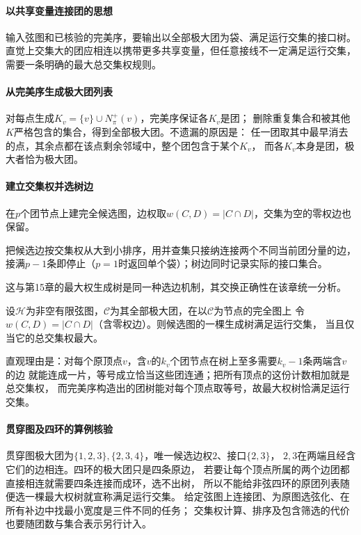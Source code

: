 \paragraph{以共享变量连接团的思想}
输入弦图和已核验的完美序，要输出以全部极大团为袋、满足运行交集的接口树。
直觉上交集大的团应相连以携带更多共享变量，但任意接线不一定满足运行交集，
需要一条明确的最大总交集权规则。

\paragraph{从完美序生成极大团列表}
对每点生成$K_v=\{v\}\cup N^+_\pi(v)$，完美序保证各$K_v$是团；
删除重复集合和被其他$K$严格包含的集合，得到全部极大团。不遗漏的原因是：
任一团取其中最早消去的点，其余点都在该点剩余邻域中，整个团包含于某个$K_v$，
而各$K_v$本身是团，极大者恰为极大团。

\paragraph{建立交集权并选树边}
在$p$个团节点上建完全候选图，边权取$w(C,D)=|C\cap D|$，交集为空的零权边也保留。
\begin{algorithm}[最大交集权团树]
  把候选边按交集权从大到小排序，用并查集只接纳连接两个不同当前团分量的边，
  接满$p-1$条即停止（$p=1$时返回单个袋）；树边同时记录实际的接口集合。
\end{algorithm}
这与第15章的最大权生成树是同一种选边机制，其交换正确性在该章统一分析。

\begin{theorem}[最大权生成树与团树]
  \label{thm:graph-theory-clique-tree-maximum-weight}
  设$\mathcal H$为非空有限弦图，$\mathcal C$为其全部极大团，在以$\mathcal C$为节点的完全图上
  令$w(C,D)=|C\cap D|$（含零权边）。则候选图的一棵生成树满足运行交集，
  当且仅当它的总交集权最大。
\end{theorem}
直观理由是：对每个原顶点$v$，含$v$的$k_v$个团节点在树上至多需要$k_v-1$条两端含$v$的边
就能连成一片，等号成立恰当这些团连通；把所有顶点的这份计数相加就是总交集权，
而完美序构造出的团树能对每个顶点取等号，故最大权树恰满足运行交集。

\paragraph{贯穿图及四环的算例核验}
贯穿图极大团为$\{1,2,3\},\{2,3,4\}$，唯一候选边权$2$、接口$\{2,3\}$，
$2,3$在两端且经含它们的边相连。四环的极大团只是四条原边，
若要让每个顶点所属的两个边团都直接相连就需要四条连接而成环，选不出树，
所以不能给非弦四环的原团列表随便选一棵最大权树就宣称满足运行交集。
给定弦图上连接团、为原图选弦化、在所有补边中找最小宽度是三件不同的任务；
交集权计算、排序及包含筛选的代价也要随团数与集合表示另行计入。


